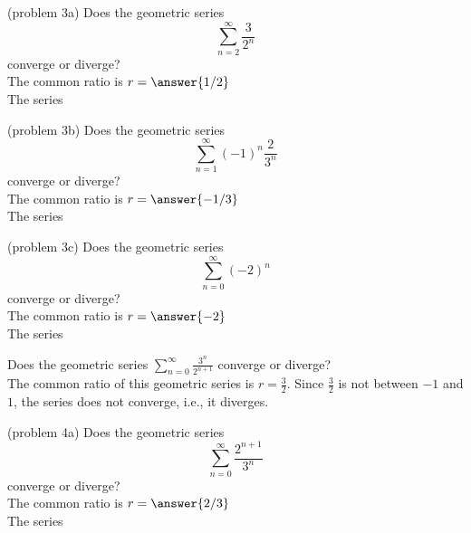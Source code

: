\documentclass{ximera}
\begin{document}
\begin{problem}(problem 3a)
 Does the geometric series
 \[
 \sum_{n=2}^\infty \frac{3}{2^n} 
 \]
 converge or diverge?\\
 The common ratio is $r = \answer{1/2}$\\
 The series
 \begin{multipleChoice}
 \end{multipleChoice}
 \end{problem}
 

\begin{problem}(problem 3b)
 Does the geometric series
 \[
 \sum_{n=1}^\infty (-1)^n\frac{2}{3^n} 
 \]
 converge or diverge?\\
 The common ratio is $r = \answer{-1/3}$\\
 The series
 \begin{multipleChoice}
 \end{multipleChoice}
 \end{problem}
 
 \begin{problem}(problem 3c)
 Does the geometric series
 \[
 \sum_{n=0}^\infty (-2)^n 
 \]
 converge or diverge?\\
 The common ratio is $r = \answer{-2}$\\
 The series
 \begin{multipleChoice}
 \end{multipleChoice}
 \end{problem}
 
 
 
 
\begin{example}[example 4]
Does the geometric series $\displaystyle{\sum_{n=0}^\infty \frac{3^n}{2^{n+1}}}$ converge or diverge?\\
The common ratio of this geometric series is $r = \frac32$. Since $\frac32$ is not between $-1$ and $1$,
the series does not converge, i.e., it diverges.
\end{example}

\begin{problem}(problem 4a)
 Does the geometric series
 \[
 \sum_{n=0}^\infty \frac{2^{n+1}}{3^n} 
 \]
 converge or diverge?\\
 The common ratio is $r = \answer{2/3}$\\
 The series
 \begin{multipleChoice}
 \end{multipleChoice}
 \end{problem}
 
\end{document}

